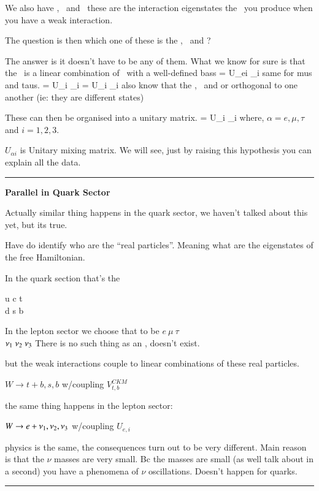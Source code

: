 {We also have \nue, \numu\ and \nutau\ these are the interaction eigenstates the \nus\ you produce when you have a weak interaction. 

The question is then which one of these is the \nue, \numu\ and \nutau ?

The answer is it doesn't have to be any of them.
What we know for sure is that the \nue\ is a linear combination of \nus\ with a well-defined bass
\be
\nue = U_{ei} \nu_i
\ee
same for mus and taus. 
\be
\numu = U_{\mu i} \nu_i
\ee
\be
\nutau = U_{\tau i} \nu_i
\ee
also know that the \nue, \numu\ and \nutau or orthogonal to one another (ie: they are different states) 

These can then be organised into a unitary matrix. 
\be
\nualpha = U_{\alpha i} \nu_i
\ee
where, $\alpha = e, \mu, \tau$ and $i = 1,2,3$.

$U_{\alpha i}$ is Unitary mixing matrix.
We will see, just by raising this hypothesis you can explain all the data.

\noindent\rule{\textwidth}{1pt}
\textbf{Parallel in Quark Sector}

Actually similar thing happens in the quark sector, we haven't talked about this yet, but its true.

Have do identify who are the ``real particles''. 
Meaning what are the eigenstates of the free Hamiltonian.

In the quark section that's the 
\begin{center}
u c t \\
d s b
\end{center}
In the lepton sector we choose that to be 
\bc
$e\ \mu\ \tau$ \\
$\nu_1\ \nu_2\ \nu_3 $
\ec
There is no such thing as an \nue, doesn't exist. 

but the weak interactions couple to linear combinations of these real particles.  

$W \rightarrow t + b,s,b$ w/coupling $V^{CKM}_{t,b}$

the same thing happens in the lepton sector:


$W \rightarrow e + \nu_1,\nu_2,\nu_3$ w/coupling $U_{e,i}$

physics is the same,  the consequences turn out to be very different.  
Main reason is that the $\nu$ masses  are very small. 
Bc the masses are small (as well talk about in a second) you have a phenomena of $\nu$ oscillations.
Doesn't happen for quarks. 

\noindent\rule{\textwidth}{1pt}

}
